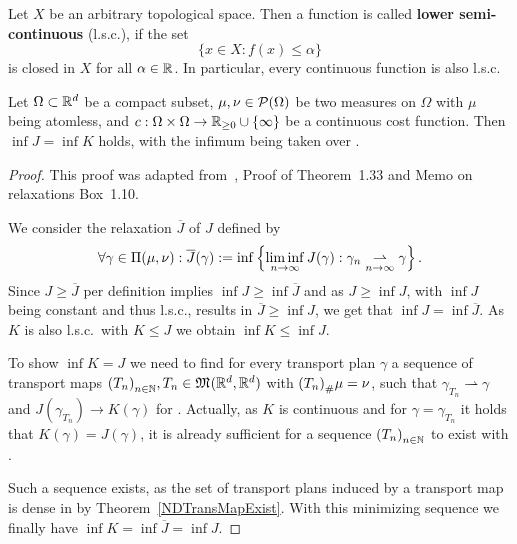 \begin{definition}\label{lsc}
	Let $X$ be an arbitrary topological space. Then a function  is called \textbf{lower semi-continuous} (l.s.c.), if the set
	\[ \{ x \in X : f(x) \le \alpha \} \]
	is closed in $X$ for all $\alpha \in \R$. In particular, every continuous function  is also l.s.c.
\end{definition}

\begin{theorem}\label{InfCoincide}
	Let $\Omega \subset \R^d$ be a compact subset, $\mu, \nu \in \PM{\Omega}$ be two measures on $\Omega$ with $\mu$ being atomless, and $\map[c]{\Omega \times \Omega}{\RZero \cup \{ \infty \}}$ be a continuous cost function. Then $\inf J = \inf K$ holds, with the infimum being taken over \TP{\mu}{\nu}.
\end{theorem}

\begin{proof}
	This proof was adapted from~\cite{San2015}, Proof of Theorem~1.33 and Memo on relaxations Box~1.10.

	We consider the relaxation $\overline{J}$ of $J$ defined by
	\[ \forall \gamma \in \TP{\mu}{\nu}: \overline{J}(\gamma) := \inf \left\{ \liminf\limits_{\Ninf} J(\gamma) : \weak{\gamma_n}{\gamma} \right\}. \]
	Since $J \ge \overline{J}$ per definition implies $\inf J \ge \inf \overline{J}$ and as $J \ge \inf J$, with $\inf J$ being constant and thus l.s.c., results in $\overline{J} \ge \inf J$, we get that $\inf J = \inf \overline{J}$. As $K$ is also l.s.c.\ with $K \le J$ we obtain $\inf K \le \inf J$.

	To show $\inf K = J$ we need to find for every transport plan $\gamma$ a sequence of transport maps ${(T_n)}_{\NinN}, T_n \in \MF{\R^d}{\R^d}$ with $\push[(T_n)]{\mu} = \nu$, such that $\gamma_{T_n} \rightharpoonup \gamma$ and $J(\gamma_{T_n}) \rightarrow K(\gamma)$ for \Ninf. Actually, as $K$ is continuous and for $\gamma = \gamma_{T_n}$ it holds that $K(\gamma) = J(\gamma)$, it is already sufficient for a sequence ${(T_n)}_{\NinN}$ to exist with .

	Such a sequence exists, as the set of transport plans induced by a transport map is dense in \TP{\mu}{\nu} by Theorem~\ref{NDTransMapExist}. With this minimizing sequence we finally have $\inf K = \inf \overline{J} = \inf J$.
\end{proof}

